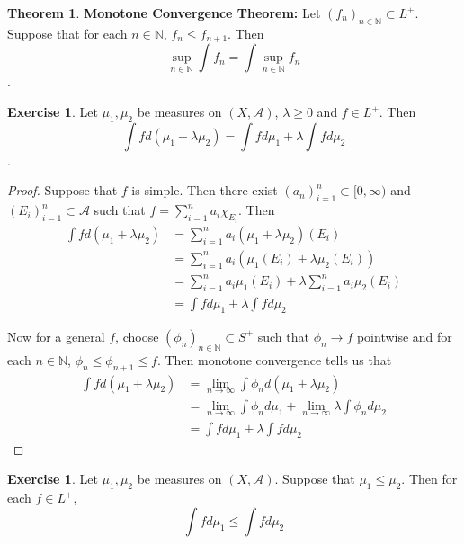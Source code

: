 \documentclass[12pt]{amsart}
\theoremstyle{definition}
\newtheorem{thm}[definition]{Theorem}
\newtheorem{ex}[definition]{Exercise}
\newcommand{\lam}{\lambda}
\newcommand{\N}{\mathbb{N}}
\newcommand{\MA}{\mathcal{A}}
\newcommand{\Rg}{[0,\infty)}
\newcommand{\limn}{\lim \limits_{n \rightarrow \infty}}
\newcommand{\lex}[1]{\label{ex:#1}}
\begin{document}
	\begin{thm}\textbf{Monotone Convergence Theorem:} 
		Let $(f_n)_{n \in \N} \subset L^+$. Suppose that for each $n \in \N$, $f_n \leq f_{n+1}$. Then $$\sup_{n \in \N} \int f_n = \int \sup_{n \in \N} f_n$$.
	\end{thm}
	
	\begin{ex} \lex{00000} 
		Let $\mu_1, \mu_2$ be measures on $(X, \MA)$, $\lam \geq 0$ and $f \in L^+$. Then $$\int f d (\mu_1 + \lam \mu_2) = \int f d\mu_1 + \lam \int f d\mu_2$$.  
	\end{ex}
	
	\begin{proof}
		Suppose that $f$ is simple. Then there exist $(a_n)_{i=1}^n \subset \Rg$ and $(E_i)_{i=1}^n \subset \MA$ such that $f = \sum\limits_{i =1}^n a_i \chi_{E_i}$. Then 
		\begin{align*}
			\int f d(\mu_1 + \lam \mu_2) 
			&= \sum\limits_{i =1}^n a_i (\mu_1 + \lam \mu_2)(E_i)\\
			&= \sum\limits_{i =1}^n a_i (\mu_1(E_i) + \lam \mu_2(E_i))\\
			&= \sum\limits_{i =1}^n a_i \mu_1(E_i) + \lam \sum\limits_{i =1}^n a_i   \mu_2(E_i)\\
			&= \int f d\mu_1 + \lam \int f d\mu_2
		\end{align*}
		
		Now for a general $f$, choose $(\phi_n)_{n \in \N} \subset S^+$ such that $\phi_n \rightarrow f$ pointwise and for each $n \in \N$, $\phi_n \leq \phi_{n+1} \leq f$. Then monotone convergence tells us that 
		\begin{align*}
			\int f d(\mu_1 + \lam \mu_2) 
			&= \limn \int \phi_n d(\mu_1 + \lam \mu_2)\\
			&= \limn \int \phi_n d \mu_1 + \limn \lam \int \phi_n d \mu_2 \\
			&= \int f d \mu_1 +  \lam \int f d \mu_2
		\end{align*}
		
	\end{proof}
	
	
	\begin{ex} \lex{00000} 
		Let $\mu_1, \mu_2$ be measures on $(X,\MA)$. Suppose that $\mu_1 \leq \mu_2$. Then for each $f \in L^+$, $$\int f d\mu_1 \leq \int f d\mu_2$$
	\end{ex}
	
\end{document}
